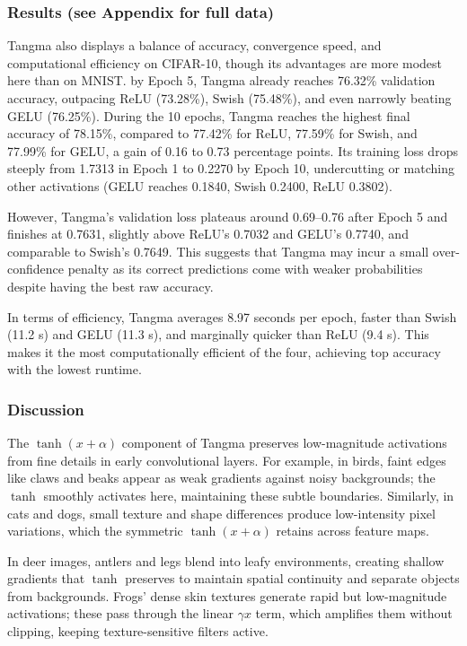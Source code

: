 \documentclass{article}
\begin{document}
\subsubsection{Results (see Appendix for full data)}

Tangma also displays a balance of accuracy, convergence speed, and computational efficiency on CIFAR-10, though its advantages are more modest here than on MNIST. by Epoch 5, Tangma already reaches 76.32\% validation accuracy, outpacing  ReLU (73.28\%), Swish (75.48\%), and even narrowly beating GELU (76.25\%). During the 10 epochs, Tangma reaches the highest final accuracy of 78.15\%, compared to 77.42\% for ReLU, 77.59\% for Swish, and 77.99\% for GELU, a gain of 0.16 to 0.73 percentage points. Its training loss drops steeply from 1.7313 in Epoch 1 to 0.2270 by Epoch 10, undercutting or matching other activations (GELU reaches 0.1840, Swish 0.2400, ReLU 0.3802).


\vspace{4pt}
\noindent
However, Tangma’s validation loss plateaus around 0.69–0.76 after Epoch 5 and finishes at 0.7631, slightly above ReLU’s 0.7032 and GELU’s 0.7740, and comparable to Swish’s 0.7649. This suggests that Tangma may incur a small over-confidence penalty as its correct predictions come with weaker probabilities despite having the best raw accuracy.

\vspace{4pt}
\noindent
In terms of efficiency, Tangma averages 8.97 seconds per epoch, faster than Swish (11.2 s) and GELU (11.3 s), and marginally quicker than ReLU (9.4 s). This makes it the most computationally efficient of the four, achieving top accuracy with the lowest runtime.


\subsubsection{Discussion}

The \(\tanh(x + \alpha)\) component of Tangma preserves low-magnitude activations from fine details in early convolutional layers. For example, in birds, faint edges like claws and beaks appear as weak gradients against noisy backgrounds; the \(\tanh\) smoothly activates here, maintaining these subtle boundaries. Similarly, in cats and dogs, small texture and shape differences produce low-intensity pixel variations, which the symmetric \(\tanh(x + \alpha)\) retains across feature maps.

\vspace{4pt}
\noindent
In deer images, antlers and legs blend into leafy environments, creating shallow gradients that \(\tanh\) preserves to maintain spatial continuity and separate objects from backgrounds. Frogs’ dense skin textures generate rapid but low-magnitude activations; these pass through the linear \(\gamma x\) term, which amplifies them without clipping, keeping texture-sensitive filters active.
\end{document}
